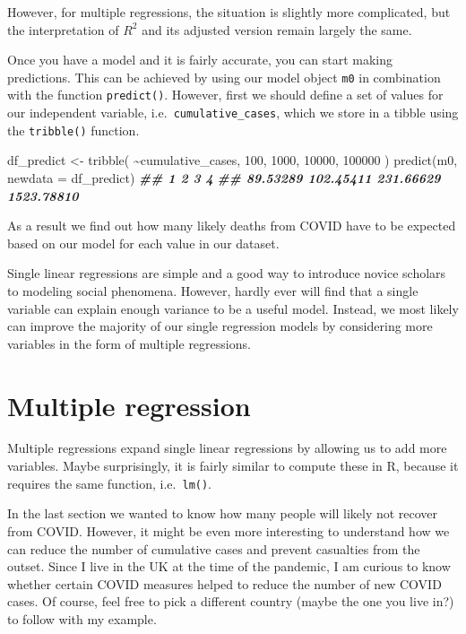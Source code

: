 \documentclass[
]{book}
\newenvironment{Shaded}{\begin{snugshade}}{\end{snugshade}}
\newcommand{\AttributeTok}[1]{\textcolor[rgb]{0.77,0.63,0.00}{#1}}
\newcommand{\DecValTok}[1]{\textcolor[rgb]{0.00,0.00,0.81}{#1}}
\newcommand{\DocumentationTok}[1]{\textcolor[rgb]{0.56,0.35,0.01}{\textbf{\textit{#1}}}}
\newcommand{\FunctionTok}[1]{\textcolor[rgb]{0.00,0.00,0.00}{#1}}
\newcommand{\NormalTok}[1]{#1}
\newcommand{\OtherTok}[1]{\textcolor[rgb]{0.56,0.35,0.01}{#1}}
\newcommand{\SpecialCharTok}[1]{\textcolor[rgb]{0.00,0.00,0.00}{#1}}
\begin{document}
However, for multiple regressions, the situation is slightly more complicated, but the interpretation of \(R^2\) and its adjusted version remain largely the same.

Once you have a model and it is fairly accurate, you can start making predictions. This can be achieved by using our model object \texttt{m0} in combination with the function \texttt{predict()}. However, first we should define a set of values for our independent variable, i.e.~\texttt{cumulative\_cases}, which we store in a tibble using the \texttt{tribble()} function.

\begin{Shaded}
\begin{Highlighting}[]
\NormalTok{df\_predict }\OtherTok{\textless{}{-}} \FunctionTok{tribble}\NormalTok{(}
  \SpecialCharTok{\textasciitilde{}}\NormalTok{cumulative\_cases,}
                \DecValTok{100}\NormalTok{,}
               \DecValTok{1000}\NormalTok{,}
              \DecValTok{10000}\NormalTok{,}
             \DecValTok{100000}
\NormalTok{)}
\FunctionTok{predict}\NormalTok{(m0, }\AttributeTok{newdata =}\NormalTok{ df\_predict)}
\DocumentationTok{\#\#          1          2          3          4 }
\DocumentationTok{\#\#   89.53289  102.45411  231.66629 1523.78810}
\end{Highlighting}
\end{Shaded}

As a result we find out how many likely deaths from COVID have to be expected based on our model for each value in our dataset.

Single linear regressions are simple and a good way to introduce novice scholars to modeling social phenomena. However, hardly ever will find that a single variable can explain enough variance to be a useful model. Instead, we most likely can improve the majority of our single regression models by considering more variables in the form of multiple regressions.

\hypertarget{multiple-regression}{%
\section{Multiple regression}\label{multiple-regression}}

Multiple regressions expand single linear regressions by allowing us to add more variables. Maybe surprisingly, it is fairly similar to compute these in R, because it requires the same function, i.e.~\texttt{lm()}.

In the last section we wanted to know how many people will likely not recover from COVID. However, it might be even more interesting to understand how we can reduce the number of cumulative cases and prevent casualties from the outset. Since I live in the UK at the time of the pandemic, I am curious to know whether certain COVID measures helped to reduce the number of new COVID cases. Of course, feel free to pick a different country (maybe the one you live in?) to follow with my example.
\end{document}
